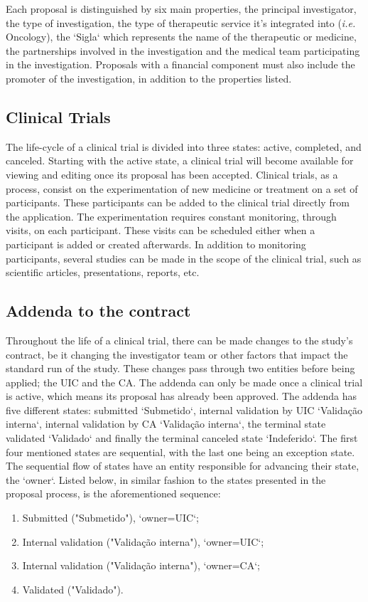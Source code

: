 Each proposal is distinguished by six main properties, the principal investigator, the type of investigation, the type of therapeutic service it's integrated into (\textit{i.e.} Oncology), the `Sigla` which represents the name of the therapeutic or medicine, the partnerships involved in the investigation and the medical team participating in the investigation.  
Proposals with a financial component must also include the promoter of the investigation, in addition to the properties listed.  

\subsection{Clinical Trials} 
\label{subsec:clinical-trials}
The life-cycle of a clinical trial is divided into three states: active, completed, and canceled.  
Starting with the active state, a clinical trial will become available for viewing and editing once its proposal has been accepted. 
Clinical trials, as a process, consist on the experimentation of new medicine or treatment on a set of participants. These participants can be added to the clinical trial directly from the application. The experimentation requires constant monitoring, through visits, on each participant. These visits can be scheduled either when a participant is added or created afterwards.  
In addition to monitoring participants, several studies can be made in the scope of the clinical trial, such as scientific articles, presentations, reports, etc. 

\subsection{Addenda to the contract}
\label{subsec:addenda-process}
Throughout the life of a clinical trial, there can be made changes to the study's contract, be it changing the investigator team or other factors that impact the standard run of the study. These changes pass through two entities before being applied; the UIC and the CA.  
The addenda can only be made once a clinical trial is active, which means its proposal has already been approved.  
The addenda has five different states: submitted `Submetido`, internal validation by UIC `Validação interna`, internal validation by CA `Validação interna`, the terminal state validated `Validado` and finally the terminal canceled state `Indeferido`.  
The first four mentioned states are sequential, with the last one being an exception state. The sequential flow of states have an entity responsible for advancing their state, the `owner`. Listed below, in similar fashion to the states presented in the proposal process, is the aforementioned sequence:
\begin{enumerate}
    \item Submitted ("Submetido"), `owner=UIC`;
    \item Internal validation ("Validação interna"), `owner=UIC`;
    \item Internal validation ("Validação interna"), `owner=CA`;
    \item Validated ("Validado").
\end{enumerate}



